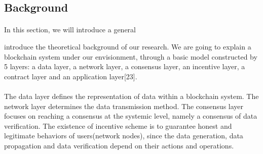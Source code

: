 \documentclass[doublespacing]{bmcart}
\begin{document}
\begin{CJK*}{UTF8}{gbsn}
\section{Background}
\paragraph{}
	In this section, we will introduce a general
	
	 introduce the theoretical background of our research. We are going to explain a blockchain system under our envisionment, through a basic model constructed by 5 layers: a data layer, a network layer, a consensus layer, an incentive layer, a contract layer and an application layer[23].
	
\paragraph{} The data layer defines the representation of data within a blockchain system. %
The network layer determines the data transmission method. The consensus layer focuses on reaching a consensus at the systemic level, namely a consensus of data verification. The existence of incentive scheme is to guarantee honest and legitimate behaviors of users(network nodes), since the data generation, data propagation and data verification depend on their actions and operations. 


\end{CJK*}
\end{document}

